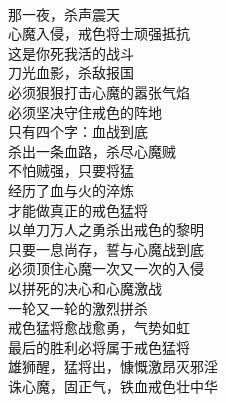 \begin{poem}[戒色猛将传]
    \begin{multicols}{2}
        \begin{center}~\\
            那一夜，杀声震天 \\ 心魔入侵，戒色将士顽强抵抗 \\ 这是你死我活的战斗 \\ 刀光血影，杀敌报国 \\ 必须狠狠打击心魔的嚣张气焰 \\ 必须坚决守住戒色的阵地 \\ 只有四个字：血战到底 \\ 杀出一条血路，杀尽心魔贼 \\ 不怕贼强，只要将猛 \\ 经历了血与火的淬炼 \\ 才能做真正的戒色猛将 \\ 以单刀万人之勇杀出戒色的黎明 \\ 只要一息尚存，誓与心魔战到底 \\ 必须顶住心魔一次又一次的入侵 \\ 以拼死的决心和心魔激战 \\ 一轮又一轮的激烈拼杀 \\ 戒色猛将愈战愈勇，气势如虹 \\ 最后的胜利必将属于戒色猛将 \\ 雄狮醒，猛将出，慷慨激昂灭邪淫 \\ 诛心魔，固正气，铁血戒色壮中华
        \end{center}
    \end{multicols}
\end{poem}

